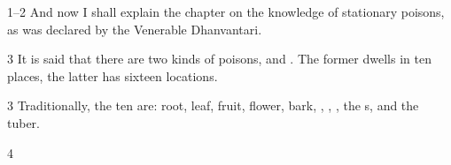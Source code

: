 \begin{translation}
    
    \item[1--2]
    And now I shall explain the chapter on the knowledge of stationary poisons,
    as was declared by the Venerable Dhanvantari.
  
    \item[3]
    \noindent It is said that there are two kinds of poisons,
     and . The former
    dwells in ten places, the latter has sixteen locations.
    \item[3]
    Traditionally, the ten are: root, leaf, fruit, flower, bark,
    , , , the
    s, and the tuber.


    \item[4]
    

\end{translation}
